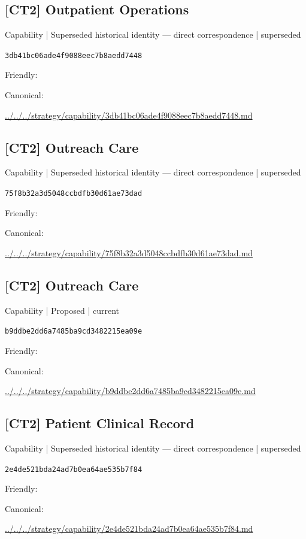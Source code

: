 \documentclass[10pt,a4paper]{article}
\begin{document}
\subsection*{[CT2] Outpatient Operations}
{\small Capability | Superseded historical identity — direct correspondence | superseded}\par
\texttt{3db41bc06ade4f9088eec7b8aedd7448}\par
Friendly: \par
Canonical: \par
{\footnotesize\url{../../../strategy/capability/3db41bc06ade4f9088eec7b8aedd7448.md}}\par
\subsection*{[CT2] Outreach Care}
{\small Capability | Superseded historical identity — direct correspondence | superseded}\par
\texttt{75f8b32a3d5048ccbdfb30d61ae73dad}\par
Friendly: \par
Canonical: \par
{\footnotesize\url{../../../strategy/capability/75f8b32a3d5048ccbdfb30d61ae73dad.md}}\par
\subsection*{[CT2] Outreach Care}
{\small Capability | Proposed | current}\par
\texttt{b9ddbe2dd6a7485ba9cd3482215ea09e}\par
Friendly: \par
Canonical: \par
{\footnotesize\url{../../../strategy/capability/b9ddbe2dd6a7485ba9cd3482215ea09e.md}}\par
\subsection*{[CT2] Patient Clinical Record}
{\small Capability | Superseded historical identity — direct correspondence | superseded}\par
\texttt{2e4de521bda24ad7b0ea64ae535b7f84}\par
Friendly: \par
Canonical: \par
{\footnotesize\url{../../../strategy/capability/2e4de521bda24ad7b0ea64ae535b7f84.md}}\par
\end{document}
